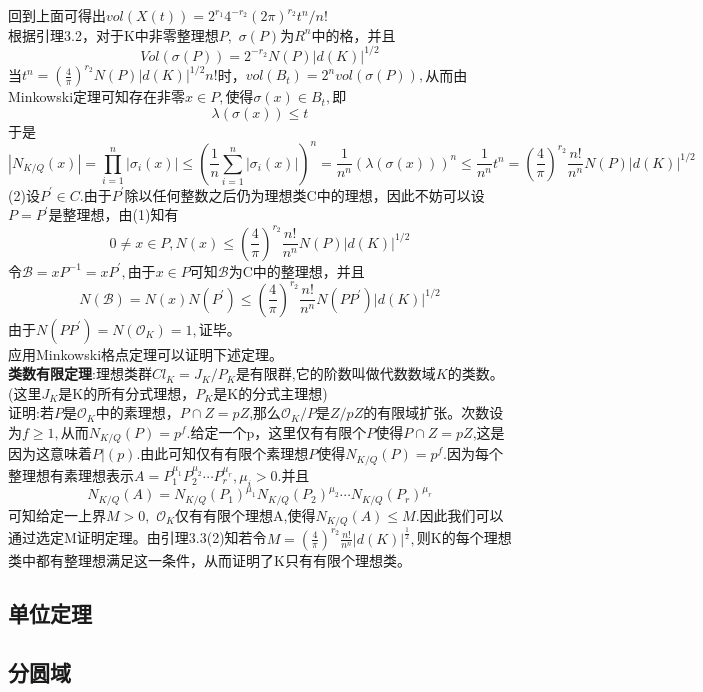 \documentclass[UTF8]{article}
\begin{document}
    回到上面可得出$vol(X(t))=2^{r_{1}}4^{-r_{2}}(2\pi)^{r_{2}}t^{n}/n!$\\
    根据引理3.2，对于K中非零整理想$P,$ $\sigma(P)$为$R^{n}$中的格，并且$$
    Vol(\sigma(P))=2^{-r_{2}}N(P)|d(K)|^{1/2}
    $$
    当$t^{n}=(\frac{4}{\pi})^{r_{2}}N(P)|d(K)|^{1/2}n!$时，$vol(B_{t})=2^{n}vol(\sigma(P)),$从而由Minkowski定理可知存在非零$x\in P,$使得$\sigma(x)\in B_{t},$即$$
    \lambda(\sigma(x))\leq t
    $$
    于是$$
    |N_{K/Q}(x)|=\prod_{i=1}^{n}|\sigma_{i}(x)|\leq (\frac{1}{n}\sum_{i=1}^{n}|\sigma_{i}(x)|)^{n}=\frac{1}{n^{n}}( \lambda(\sigma(x)))^{n}\leq \frac{1}{n^{n}}t^{n}=(\frac{4}{\pi})^{r_{2}}\frac{n!}{n^{n}}N(P)|d(K)|^{1/2}
    $$
    (2)设$P^{'}\in C.$由于$P^{'}$除以任何整数之后仍为理想类C中的理想，因此不妨可以设$P=P^{'}$是整理想，由(1)知有$$
    0\neq x\in P,N(x)\leq (\frac{4}{\pi})^{r_{2}}\frac{n!}{n^{n}}N(P)|d(K)|^{1/2}
    $$
    令$\mathcal{B}=xP^{-1}=xP^{'},$由于$x\in P$可知$\mathcal{B}$为C中的整理想，并且$$
    N(\mathcal{B})=N(x)N(P^{'})\leq (\frac{4}{\pi})^{r_{2}}\frac{n!}{n^{n}}N(PP^{'})|d(K)|^{1/2}
    $$由于$N(PP^{'})=N(\mathcal{O}_{K})=1,$证毕。\\
    应用Minkowski格点定理可以证明下述定理。\\
    \textbf{类数有限定理}:理想类群$Cl_{K}=J_{K}/P_{K}$是有限群,它的阶数叫做代数数域$K$的类数。(这里$J_{K}$是K的所有分式理想，$P_{K}$是K的分式主理想)\\
    证明:若$P$是$\mathcal{O}_{K}$中的素理想，$P\cap Z=pZ$,那么$\mathcal{O}_{K}/P$是$Z/pZ$的有限域扩张。次数设为$f\geq 1,$从而$N_{K/Q}(P)=p^{f}.$给定一个p，这里仅有有限个$P$使得$P\cap Z=pZ$,这是因为这意味着$P|(p).$由此可知仅有有限个素理想$P$使得$N_{K/Q}(P)=p^{f}.$因为每个整理想有素理想表示$A=P_{1}^{\mu_{1}}P_{2}^{\mu_{2}}\cdots P_{r}^{\mu_{r}},\mu_{i}>0.$并且$$
   N_{K/Q}(A)=N_{K/Q}(P_{1})^{\mu_{1}}N_{K/Q}(P_{2})^{\mu_{2}}\cdots N_{K/Q}(P_{r})^{\mu_{r}}
    $$
    可知给定一上界$M>0,$ $\mathcal{O}_{K}$仅有有限个理想A,使得$N_{K/Q}(A)\leq M.$因此我们可以通过选定M证明定理。由引理3.3(2)知若令$M=(\frac{4}{\pi})^{r_{2}}\frac{n!}{n^{n}}|d(K)|^{\frac{1}{2}},$则K的每个理想类中都有整理想满足这一条件，从而证明了K只有有限个理想类。
    \subsection{单位定理}
    \subsection{分圆域}
\end{document}
